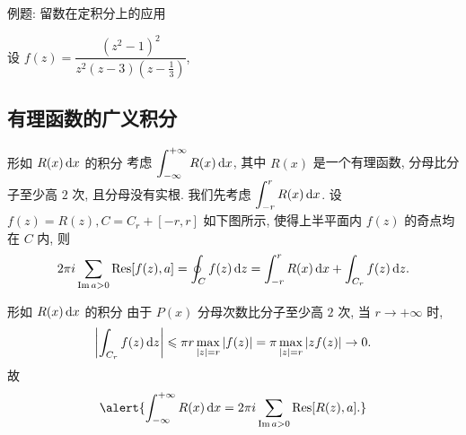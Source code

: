\begin{frame}{例题: 留数在定积分上的应用\noexer}
	\onslide<+->
	\begin{solutionc}
		设 $f(z)=\dfrac{(z^2-1)^2}{z^2(z-3)(z-\frac13)}$,
		\onslide<+->{则
			\[\Res[f(z),0]=\frac{10}3,\quad\Res[f(z),\frac13]=-\frac83,\]
		}
		\vspace{-\baselineskip}
		\onslide<+->{
			\begin{align*}
				\int_0^{2\pi}\frac{\sin^2\theta}{5-3\cos\theta}\diff\theta
				&=-\frac i6\cdot 2\pi i\Bigl[\Res[f(z),0]+\Res[f(z),\frac13]\Bigr]\\
				&=\frac{2\pi}9.
			\end{align*}
		}
		\vspace{-\baselineskip}
	\end{solutionc}
\end{frame}

\subsection{有理函数的广义积分}

\begin{frame}{形如 $R(x)\,\mathrm{d} x$ 的积分\noexer}
	\onslide<+->
	考虑 $\displaystyle\int_{-\infty}^{+\infty}R(x)\,\mathrm{d} x$, 其中 $R(x)$ 是一个有理函数, 分母比分子至少高 $2$ 次, 且分母没有实根.
	\onslide<+->
	我们先考虑 $\displaystyle\int_{-r}^rR(x)\,\mathrm{d} x$.
	\onslide<+->
	设 $f(z)=R(z),C=C_r+[-r,r]$ 如下图所示, 使得上半平面内 $f(z)$ 的奇点均在 $C$ 内,
	\onslide<+->
	则
	\[2\pi i\sum_{\operatorname{Im} a>0}{\mathrm{Res}}[f(z),a]=\oint_Cf(z)\,\mathrm{d} z=\int_{-r}^rR(x)\,\mathrm{d} x+\int_{C_r}f(z)\,\mathrm{d} z.\]
	\onslide<3->
	\begin{center}
	\end{center}
\end{frame}


\begin{frame}{形如 $R(x)\,\mathrm{d} x$ 的积分\noexer}
	\onslide<+->
	由于 $P(x)$ 分母次数比分子至少高 $2$ 次,
	\onslide<+->
	当 $r\to+\infty$ 时,
	\[\left|\int_{C_r}f(z)\,\mathrm{d} z\right|\leqslant \pi r\max_{|z|=r}|f(z)|
	=\pi \max_{|z|=r}|zf(z)|\to 0.\]
	\onslide<+->
	故
	\[\alert{\int_{-\infty}^{+\infty}R(x)\diff x=2\pi i\sum_{\Im a>0}\Res[R(z),a].}\]
\end{frame}


